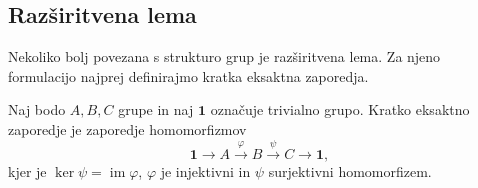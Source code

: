  


\subsection{Razširitvena lema}

Nekoliko bolj povezana s strukturo grup je razširitvena lema. Za njeno formulacijo najprej definirajmo kratka eksaktna zaporedja.
\begin{definicija}
\label{def_kratko_eksaktno_zaporedje}
Naj bodo $A, B, C$ grupe in naj $\mathbf{1}$ označuje trivialno grupo. Kratko eksaktno zaporedje je zaporedje homomorfizmov
\begin{equation*}
\mathbf{1} \to A \xrightarrow{\varphi} B \xrightarrow{\psi} C \to \mathbf{1},
\end{equation*}  
kjer je $\ker \psi = \operatorname{im} \varphi$, $\varphi$ je injektivni in $\psi$ surjektivni homomorfizem.
\end{definicija}


